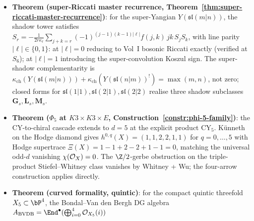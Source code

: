 \begin{itemize}[leftmargin=1.5em,topsep=0.3ex,itemsep=0.5ex]
 the naive six-way convergence of CY-C is falsified. For
 $X = K3 \times E$, the six routes produce algebras with
 stratified \emph{lattice rank} $\rho^{R_i}$: $R_1 = 3$,
 $R_3 = 24$, $R_4 = 12$, $R_5 = R_6 = 3$; $R_2$ (Borcherds)
 is a source branch, not a pentagon node.
 $\kappa_{\mathrm{ch}}$ is constant around the cycle (Hodge
 supertrace, route-independent); the genuine isomorphism
 invariant is $\rho^{R_i}$. The six routes are six different
	 constructions comparing with the single chosen framed
 $\PhiFA_3(D^b\mathrm{Coh}(K3 \times E))$ datum; each specialises to
 a distinct $\Eone$-chiral shadow under its own choice of
 $\Sigma_2$-cycle
 (Remark~\ref{rem:multiple-e1-specialisations}). The
 universal object is the pentagon colimit over named
 intertwiners $\beta_{13}, \beta_{34},
 \beta_{45}, \beta_{56}, \beta_{61}$
 (Proposition~\ref{prop:cy-c-pentagon-colimit}); the pentagon
 $\rho$-cycle is $3 \to 24 \to 12 \to 3 \to 3 \to 3$.
 \item \textbf{Theorem (super-Riccati master recurrence,
 Theorem~\ref{thm:super-riccati-master-recurrence})}: for
 the super-Yangian $Y(\mathfrak{sl}(m | n))$, the shadow
 tower satisfies
 $S_r = -\frac{1}{2 r \kappa_\ell}
 \sum_{j+k=r} (-1)^{(j-1)(k-1)|\ell|} f(j, k)\, jk\,
 S_j S_k$,
 with line parity $|\ell| \in \{0, 1\}$: at $|\ell| = 0$
 reducing to Vol~I bosonic Riccati exactly (verified at
 $S_6$); at $|\ell| = 1$ introducing the super-convolution
 Koszul sign. The super-shadow complementarity is
 $\kappa_{\mathrm{ch}}(Y(\mathfrak{sl}(m|n))) +
 \kappa_{\mathrm{ch}}(Y(\mathfrak{sl}(n|m))^!) = \max(m, n)$,
 not zero; closed forms for $\mathfrak{sl}(1|1),
 \mathfrak{sl}(2|1), \mathfrak{sl}(2|2)$ realise three shadow
 subclasses $\mathbf{G}_s, \mathbf{L}_s, \mathbf{M}_s$.
 \item \textbf{Theorem ($\Phi_5$ at $K3 \times K3 \times E$,
 Construction~\ref{constr:phi-5-family})}: the CY-to-chiral
 cascade extends to $d = 5$ at the explicit product CY$_5$.
 K\"unneth on the Hodge diamond gives
 $h^{0,q}(X) = (1, 1, 2, 2, 1, 1)$ for $q = 0, \ldots, 5$
 with Hodge supertrace
 $\Xi(X) = 1 - 1 + 2 - 2 + 1 - 1 = 0$, matching the
 universal odd-$d$ vanishing
 $\chi(\mathcal{O}_X) = 0$. The $\Z/2$-gerbe obstruction on the
 triple-product Stiefel--Whitney class vanishes by Whitney
 + Wu; the four-arrow construction applies directly.
 \item \textbf{Theorem (curved formality, quintic)}: for the
 compact quintic threefold $X_5 \subset \bP^4$, the
 Bondal--Van den Bergh DG algebra
 $A_{\mathrm{BVDB}} =
 \End^\bullet(\bigoplus_{i=0}^4 \cO_{X_5}(i))$

\end{itemize}
